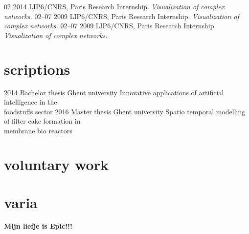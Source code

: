 \documentclass[]{friggeri-cv}
\begin{document}
\begin{entrylist}
  \entry
    {02 2014}
    {LIP6/CNRS, Paris}
    {Research Internship.}
    {\emph{Visualization of complex networks.}}
  \entry
    {02–07 2009}
    {LIP6/CNRS, Paris}
    {Research Internship.}
    {\emph{Visualization of complex networks.}}
 \entry
    {02–07 2009}
    {LIP6/CNRS, Paris}
    {Research Internship.}
    {\emph{Visualization of complex networks.}}
 
    
\end{entrylist}

\section{scriptions}

\begin{entrylist}
  \entry
    {2014}
    {Bachelor thesis}
    {Ghent university}
    {Innovative applications of artificial intelligence in the\\ foodstuffs sector}
  \entry
    {2016}
    {Master thesis}
    {Ghent university}
    {Spatio temporal modelling of filter cake formation in \\ membrane bio reactors}
  
\end{entrylist}

\section{voluntary work}
\section{varia}

\Large \textbf{Mijn liefje is Epic!!!}

% 
\end{document}
